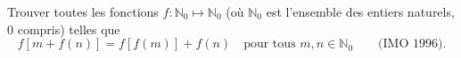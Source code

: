 Trouver toutes les fonctions $f : \mathbb{N}_0 \mapsto \mathbb{N}_0$ (où $\mathbb{N}_0$ est l'ensemble des entiers naturels, $0$ compris) telles que
\[ f[m + f(n)] = f[f(m)] + f(n) \quad\text{pour tous } m, n \in \mathbb{N}_0 \qquad \text{(IMO 1996).} \]
